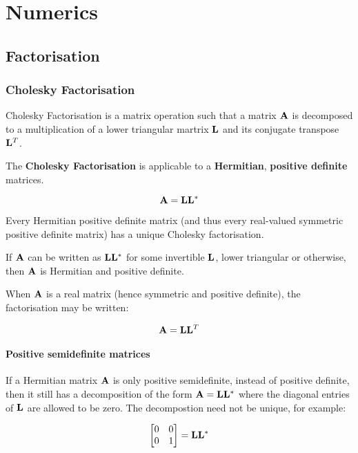 \newpage
\chapter{Numerics}

\section{Factorisation}

\subsection{Cholesky Factorisation}

Cholesky Factorisation is a matrix operation such that a matrix $ \mathbf{A} $ is
decomposed to a multiplication of a lower triangular martrix $ \mathbf{L} $ and its
conjugate transpose $ \mathbf{L}^T $.

The \textbf{Cholesky Factorisation} is applicable to a \textbf{Hermitian},
\textbf{positive definite} matrices.

\begin{equation}
    \mathbf{A} = \mathbf{L} \mathbf{L}^*
\end{equation}

Every Hermitian positive definite matrix (and thus every real-valued symmetric
positive definite matrix) has a unique Cholesky factorisation.

If $ \mathbf{A} $ can be written as $ \mathbf{L} \mathbf{L}^* $ for some invertible $ \mathbf{L} $,
lower triangular or otherwise, then $ \mathbf{A} $ is Hermitian and positive definite.

When $ \mathbf{A} $ is a real matrix (hence symmetric and positive definite), the
factorisation may be written:

\begin{equation}
    \mathbf{A} = \mathbf{L} \mathbf{L}^T
\end{equation}

\subsubsection{Positive semidefinite matrices}

If a Hermitian matrix $ \mathbf{A} $ is only positive semidefinite, instead of positive
definite, then it still has a decomposition of the form $ \mathbf{A} = \mathbf{L} \mathbf{L}^* $
where the diagonal entries of $ \mathbf{L} $ are allowed to be zero. The decompostion
need not be unique, for example:

\begin{equation}
    \begin{bmatrix}
        0 & 0 \\
        0 & 1\\
    \end{bmatrix}
    = \mathbf{L} \mathbf{L}^*
\end{equation}

